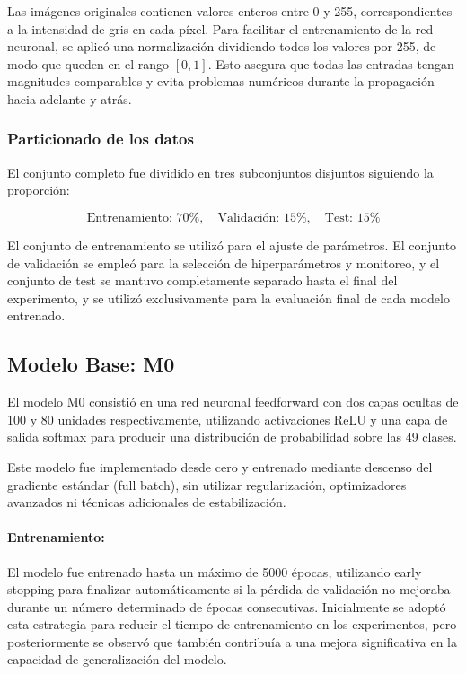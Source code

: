 \documentclass[11pt]{article}
\begin{document}
Las imágenes originales contienen valores enteros entre 0 y 255, correspondientes a la intensidad de gris en cada píxel. Para facilitar el entrenamiento de la red neuronal, se aplicó una normalización dividiendo todos los valores por 255, de modo que queden en el rango \([0,1]\). Esto asegura que todas las entradas tengan magnitudes comparables y evita problemas numéricos durante la propagación hacia adelante y atrás.

\subsubsection*{Particionado de los datos}

El conjunto completo fue dividido en tres subconjuntos disjuntos siguiendo la proporción:

\[
\text{Entrenamiento: } 70\%, \quad
\text{Validación: } 15\%, \quad
\text{Test: } 15\%
\]

El conjunto de entrenamiento se utilizó para el ajuste de parámetros. El conjunto de validación se empleó para la selección de hiperparámetros y monitoreo, y el conjunto de test se mantuvo completamente separado hasta el final del experimento, y se utilizó exclusivamente para la evaluación final de cada modelo entrenado.
\subsection*{Modelo Base: M0}

El modelo M0 consistió en una red neuronal feedforward con dos capas ocultas de 100 y 80 unidades respectivamente, utilizando activaciones ReLU y una capa de salida softmax para producir una distribución de probabilidad sobre las 49 clases.

Este modelo fue implementado desde cero y entrenado mediante descenso del gradiente estándar (full batch), sin utilizar regularización, optimizadores avanzados ni técnicas adicionales de estabilización.

\paragraph{Entrenamiento:} El modelo fue entrenado hasta un máximo de 5000 épocas, utilizando early stopping para finalizar automáticamente si la pérdida de validación no mejoraba durante un número determinado de épocas consecutivas. Inicialmente se adoptó esta estrategia para reducir el tiempo de entrenamiento en los experimentos, pero posteriormente se observó que también contribuía a una mejora significativa en la capacidad de generalización del modelo.
\end{document}
